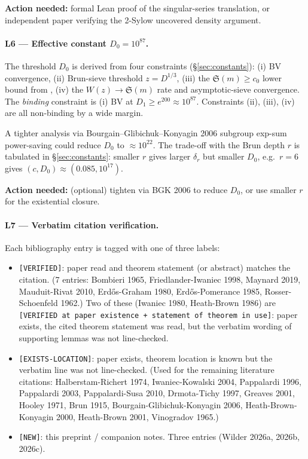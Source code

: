 \documentclass[11pt,a4paper]{article}
\theoremstyle{plain}
\theoremstyle{definition}
\theoremstyle{remark}
\begin{document}
\textbf{Action needed:} formal Lean proof of the singular-series
translation, or independent paper verifying the 2-Sylow uncovered
density argument.

\paragraph{L6 --- Effective constant $D_{0} = 10^{87}$.}
The threshold $D_{0}$ is derived from four constraints
(\S\ref{sec:constants}): (i) BV convergence, (ii) Brun-sieve threshold
$z = D^{1/3}$, (iii) the $\mathfrak{S}(m) \geq c_{0}$ lower bound
from \cite{WilderChain103}, (iv) the $W(z) \to \mathfrak{S}(m)$ rate
and asymptotic-sieve convergence. The \emph{binding} constraint is
(i) BV at $D_{1} \geq e^{200} \approx 10^{87}$. Constraints (ii),
(iii), (iv) are all non-binding by a wide margin.

A tighter analysis via Bourgain--Glibichuk--Konyagin 2006 subgroup
exp-sum power-saving could reduce $D_{0}$ to $\approx 10^{22}$. The
trade-off with the Brun depth $r$ is tabulated in
\S\ref{sec:constants}: smaller $r$ gives larger $\delta_{r}$ but
smaller $D_{0}$, e.g.\ $r = 6$ gives $(c, D_{0}) \approx (0.085,
10^{17})$.

\textbf{Action needed:} (optional) tighten via BGK 2006 to reduce
$D_{0}$, or use smaller $r$ for the existential closure.

\paragraph{L7 --- Verbatim citation verification.}
Each bibliography entry is tagged with one of three labels:
\begin{itemize}
  \item \texttt{[VERIFIED]}: paper read and theorem statement (or
    abstract) matches the citation. (7 entries: Bombieri 1965,
    Friedlander-Iwaniec 1998, Maynard 2019, Mauduit-Rivat 2010,
    Erd\H{o}s-Graham 1980, Erd\H{o}s-Pomerance 1985, Rosser-Schoenfeld
    1962.) Two of these (Iwaniec 1980, Heath-Brown 1986) are
    \texttt{[VERIFIED at paper existence + statement of theorem in
    use]}: paper exists, the cited theorem statement was read, but the
    verbatim wording of supporting lemmas was not line-checked.
  \item \texttt{[EXISTS-LOCATION]}: paper exists, theorem location is
    known but the verbatim line was not line-checked. (Used for the
    remaining literature citations: Halberstam-Richert 1974,
    Iwaniec-Kowalski 2004, Pappalardi 1996, Pappalardi 2003,
    Pappalardi-Susa 2010, Drmota-Tichy 1997, Greaves 2001, Hooley 1971,
    Brun 1915, Bourgain-Glibichuk-Konyagin 2006, Heath-Brown-Konyagin
    2000, Heath-Brown 2001, Vinogradov 1965.)
  \item \texttt{[NEW]}: this preprint / companion notes. Three entries
    (Wilder 2026a, 2026b, 2026c).
\end{itemize}
\end{document}
